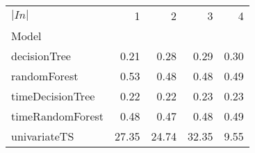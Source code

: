 \begin{tabular}{lrrrr}
\toprule
$|In|$ & 1 & 2 & 3 & 4 \\
Model &  &  &  &  \\
\midrule
decisionTree & 0.21 & 0.28 & 0.29 & 0.30 \\
randomForest & 0.53 & 0.48 & 0.48 & 0.49 \\
timeDecisionTree & 0.22 & 0.22 & 0.23 & 0.23 \\
timeRandomForest & 0.48 & 0.47 & 0.48 & 0.49 \\
univariateTS & 27.35 & 24.74 & 32.35 & 9.55 \\
\bottomrule
\end{tabular}
